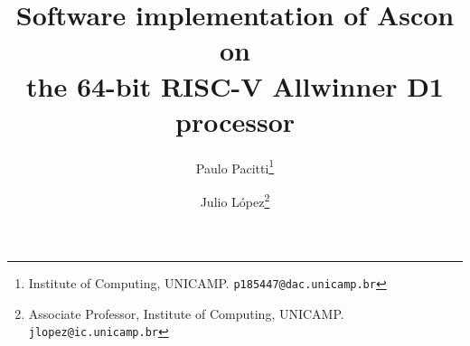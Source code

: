 \documentclass[11pt,twoside]{article}
\begin{document}
% 
\TRMakeCover


%
\pagestyle{myheadings}
\thispagestyle{empty}

%
\title{Software implementation of Ascon on \\ the 64-bit RISC-V Allwinner D1 processor}

\author{Paulo Pacitti\thanks{Institute of Computing, UNICAMP. \texttt{p185447@dac.unicamp.br}} \and
  Julio  López\thanks{Associate Professor, Institute of Computing, UNICAMP. \texttt{jlopez@ic.unicamp.br}}}
\date{}
\maketitle

\end{document}
